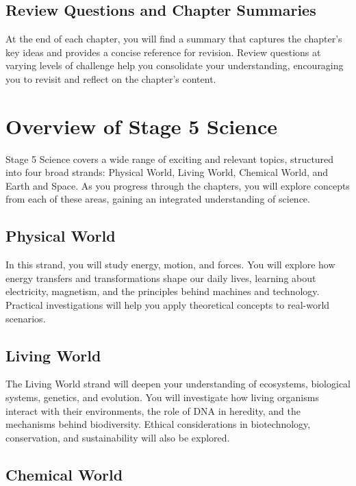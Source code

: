 \subsection{Review Questions and Chapter Summaries}

At the end of each chapter, you will find a summary that captures the chapter's key ideas and provides a concise reference for revision. Review questions at varying levels of challenge help you consolidate your understanding, encouraging you to revisit and reflect on the chapter’s content.

\FloatBarrier

\section{Overview of Stage 5 Science}

Stage 5 Science covers a wide range of exciting and relevant topics, structured into four broad strands: Physical World, Living World, Chemical World, and Earth and Space. As you progress through the chapters, you will explore concepts from each of these areas, gaining an integrated understanding of science.

\subsection{Physical World}

In this strand, you will study energy, motion, and forces. You will explore how energy transfers and transformations shape our daily lives, learning about electricity, magnetism, and the principles behind machines and technology. Practical investigations will help you apply theoretical concepts to real-world scenarios.

\subsection{Living World}

The Living World strand will deepen your understanding of ecosystems, biological systems, genetics, and evolution. You will investigate how living organisms interact with their environments, the role of DNA in heredity, and the mechanisms behind biodiversity. Ethical considerations in biotechnology, conservation, and sustainability will also be explored.

\subsection{Chemical World}

